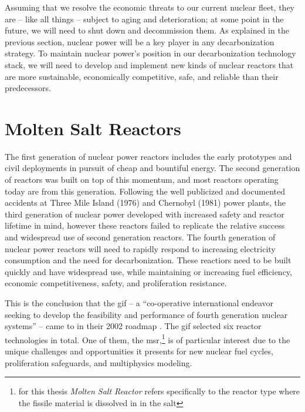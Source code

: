 Assuming that we resolve the economic threats to our current nuclear fleet, they
are -- like all things -- subject to aging and deterioration; at some point in
the future, we will need to shut down and decommission them. As explained in the
previous section, nuclear power will be a key player in any decarbonization
strategy. To maintain nuclear power's position in our decarbonization technology
stack, we will need to develop and implement new kinds of nuclear reactors that
are more sustainable, economically competitive, safe, and reliable than their
predecessors.
 
\section{Molten Salt Reactors}%
\label{sec:molten_salt_reactors}

The first generation of nuclear power reactors includes the early prototypes and
civil deployments in pursuit of cheap and bountiful energy. The second
generation of reactors was built on top of this momentum, and most reactors
operating today are from this generation. Following the well publicized and
documented accidents at Three Mile Island (1976) and Chernobyl (1981) power
plants, the third generation of nuclear power developed with increased safety
and reactor lifetime in mind, however these reactors failed to replicate the
relative success and widespread use of second generation reactors. The fourth
generation of nuclear power reactors will need to rapidly respond to increasing
electricity consumption and the need for decarbonization. These reactiors need
to be built quickly and have widespread use, while maintaining or increasing
fuel efficiency, economic competitiveness, safety, and proliferation resistance.

This is the conclusion that the \Gls{gif} -- a ``co-operative
international endeavor seeking to develop the feasibility and performance of
fourth generation nuclear systems'' \cite{gif_homepage} -- came to in their 2002
roadmap \cite{doe-ne_technology_2002}. The \Gls{gif} selected six reactor
technologies in total. One of them, the \Gls{msr},\footnote{for
this thesis {\it Molten Salt Reactor} refers specifically to the reactor type
where the fissile material is dissolved in in the salt} is of
particular interest due to the unique challenges and opportunities it presents
for new nuclear fuel cycles, proliferation safeguards, and multiphysics
modeling.

